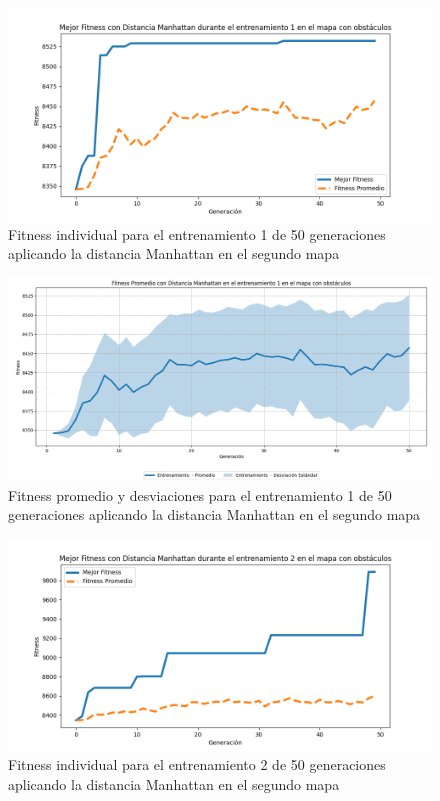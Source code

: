 \documentclass[conference]{IEEEtran}
\begin{document}
\begin{figure}[H]
    \centering
    \includegraphics[width=0.9 \linewidth]{Manhattan/Mapa2/Fitness_1_Map2_Manh_50Gen.png}
    \caption{Fitness individual para el entrenamiento 1 de 50 generaciones aplicando la distancia Manhattan en el segundo mapa}
    \label{fig:manh_1_50_m2}
\end{figure}
\begin{figure}[H]
    \centering
    \includegraphics[width=0.9 \linewidth]{Manhattan/Mapa2/Fitness_1_Map2_Manh_50Gen_Sombra.png}
    \caption{Fitness promedio y desviaciones para el entrenamiento 1 de 50 generaciones aplicando la distancia Manhattan en el segundo mapa}
    \label{fig:manh_1_50_sombra_m2}
\end{figure}

\begin{figure}[H]
    \centering
    \includegraphics[width=0.9 \linewidth]{Manhattan/Mapa2/Fitness_2_Map2_Manh_50Gen.png}
    \caption{Fitness individual para el entrenamiento 2 de 50 generaciones aplicando la distancia Manhattan en el segundo mapa}
    \label{fig:manh_2_50_m2}
\end{figure}
\end{document}
